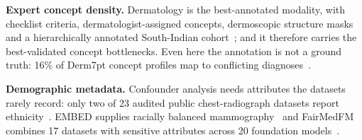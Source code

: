 \textbf{Expert concept density.} Dermatology is the best-annotated modality, with checklist criteria,
dermatologist-assigned concepts, dermoscopic structure masks and a hierarchically annotated South-Indian
cohort~\cite{kawahara2019derm7pt,daneshjou2023skincon,mendonca2013ph2,codella2019isic,madarkar2025dermacon};
and it therefore carries the best-validated concept bottlenecks. Even here the annotation is not a ground
truth: 16\% of Derm7pt concept profiles map to conflicting diagnoses~\cite{napoles2026concept}.

\textbf{Demographic metadata.} Confounder analysis needs attributes the datasets rarely record: only two of
23 audited public chest-radiograph datasets report ethnicity~\cite{yi2022demographic}. EMBED supplies
racially balanced mammography~\cite{jeong2022embed} and FairMedFM combines 17 datasets with sensitive
attributes across 20 foundation models~\cite{jin2024fairmedfm}.

